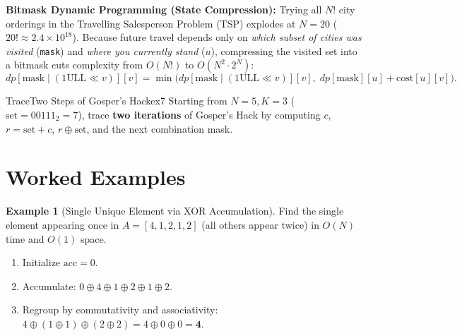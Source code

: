 \documentclass[11pt,a4paper]{article}
\theoremstyle{definition}
\newtheorem{example}{Example}[section]
\begin{document}
\textbf{Bitmask Dynamic Programming (State Compression):} Trying all $N!$ city orderings in the Travelling Salesperson Problem (TSP) explodes at $N = 20$ ($20! \approx 2.4 \times 10^{18}$). Because future travel depends only on \emph{which subset of cities was visited} (\texttt{mask}) and \emph{where you currently stand} ($u$), compressing the visited set into a bitmask cuts complexity from $O(N!)$ to $O(N^2 \cdot 2^N)$:
$$dp[\text{mask} \mid (1\text{ULL} \ll v)][v] = \min\big(dp[\text{mask} \mid (1\text{ULL} \ll v)][v],\; dp[\text{mask}][u] + \text{cost}[u][v]\big).$$

\begin{tryitbox}{Trace}{Two Steps of Gosper's Hack}{ex7}
Starting from $N = 5, K = 3$ ($\text{set} = 00111_2 = 7$), trace \textbf{two iterations} of Gosper's Hack by computing $c$, $r = \text{set} + c$, $r \oplus \text{set}$, and the next combination mask.
\end{tryitbox}

\section{Worked Examples}

\begin{example}[Single Unique Element via XOR Accumulation]
Find the single element appearing once in $A = [4, 1, 2, 1, 2]$ (all others appear twice) in $O(N)$ time and $O(1)$ space.
\begin{enumerate}[itemsep=2pt]
    \item Initialize $\text{acc} = 0$.
    \item Accumulate: $0 \oplus 4 \oplus 1 \oplus 2 \oplus 1 \oplus 2$.
    \item Regroup by commutativity and associativity: $4 \oplus (1 \oplus 1) \oplus (2 \oplus 2) = 4 \oplus 0 \oplus 0 = \mathbf{4}$.
\end{enumerate}
\end{example}
\end{document}
